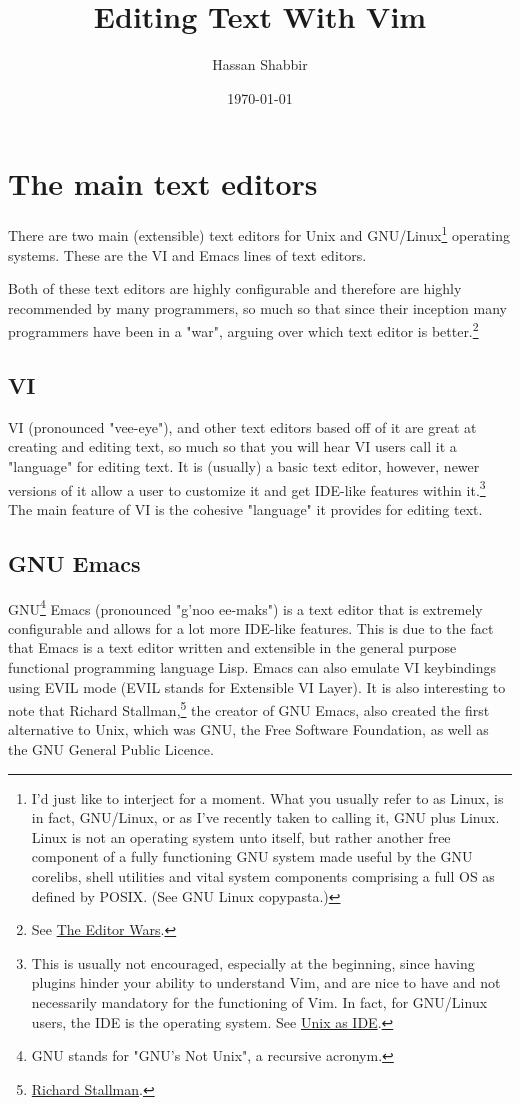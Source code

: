 \documentclass[11pt]{article}
\author{Hassan Shabbir}
\date{\today}
\title{Editing Text With Vim}
\begin{document}
\maketitle
\tableofcontents

\newpage

\section{The main text editors}
\label{sec:orgfc36d33}
There are two main (extensible) text editors for Unix and GNU/Linux\footnote{I'd just like to interject for a moment. What you usually refer
to as Linux, is in fact, GNU/Linux, or as I've recently taken to calling
it, GNU plus Linux. Linux is not an operating system unto itself, but 
rather another free component of a fully functioning GNU system made 
useful by the GNU corelibs, shell utilities and vital system components
comprising a full OS as defined by POSIX. (See GNU Linux copypasta.)}
operating systems. These are the VI and Emacs lines of text editors.

Both of these text editors are highly configurable and therefore are highly
recommended by many programmers, so much so that since their inception many
programmers have been in a "war", arguing over which text editor is
better.\footnote{See \href{https://en.wikipedia.org/wiki/Editor\_war}{The Editor Wars}.}
\subsection{VI}
\label{sec:org138a04d}
VI (pronounced "vee-eye"), and other text editors based off of it are great at
creating and editing text, so much so that you will hear VI users call it a 
"language" for editing text. It is (usually) a basic text editor, however, newer
versions of it allow a user to customize it and get IDE-like features within
it.\footnote{This is usually not encouraged, especially at the beginning,
since having plugins hinder your ability to understand Vim, and are nice
to have and not necessarily mandatory for the functioning of Vim. In
fact, for GNU/Linux users, the IDE is the operating system. See
\href{https://sanctum.geek.nz/arabesque/series/unix-as-ide/}{Unix as IDE}.} The main feature of VI is the cohesive "language" it provides for
editing text.
\subsection{GNU Emacs}
\label{sec:orgd428fc6}
GNU\footnote{GNU stands for "GNU's Not Unix", a recursive acronym.} Emacs (pronounced "g'noo ee-maks") is a text editor that is extremely
configurable and allows for a lot more IDE-like features. This is due to the
fact that Emacs is a text editor written and extensible in the general purpose
functional programming language Lisp. Emacs can also emulate VI keybindings
using EVIL mode (EVIL stands for Extensible VI Layer). It is also interesting to
note that Richard Stallman,\footnote{\href{https://en.wikipedia.org/wiki/Richard\_Stallman}{Richard Stallman}.} the creator of GNU Emacs, also created the
first alternative to Unix, which was GNU, the Free Software Foundation, as well
as the GNU General Public Licence.
\end{document}
